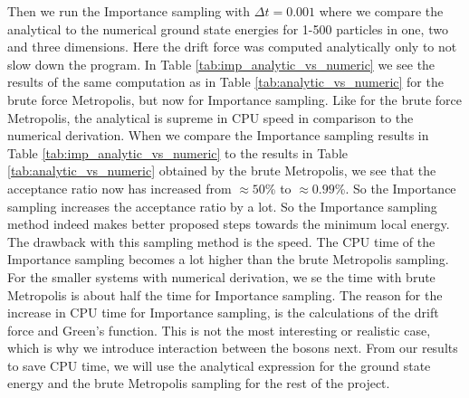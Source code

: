 \documentclass[12pt,a4paper,english]{article}
\begin{document}
Then we run the Importance sampling with $\Delta t=0.001$ where we compare the analytical to the numerical ground state energies for 1-500 particles in one, two and three dimensions. Here the drift force was computed analytically only to not slow down the program. In Table \ref{tab:imp_analytic_vs_numeric} we see the results of the same computation as in Table \ref{tab:analytic_vs_numeric} for the brute force Metropolis, but now for Importance sampling. Like for the brute force Metropolis, the analytical is supreme in CPU speed in comparison to the numerical derivation. When we compare the Importance sampling results in Table \ref{tab:imp_analytic_vs_numeric} to the results in Table \ref{tab:analytic_vs_numeric} obtained by the brute Metropolis, we see that the acceptance ratio now has increased from $\approx50$\% to $\approx0.99$\%. So the Importance sampling increases the acceptance ratio by a lot. So the Importance sampling method indeed makes better proposed steps towards the minimum local energy. The drawback with this sampling method is the speed. The CPU time of the Importance sampling becomes a lot higher than the brute Metropolis sampling. For the smaller systems with numerical derivation, we se the time with brute Metropolis is about half the time for Importance sampling. The reason for the increase in CPU time for Importance sampling, is the calculations of the drift force and Green's function. This is not the most interesting or realistic case, which is why we introduce interaction between the bosons next. From our results to save CPU time, we will use the analytical expression for the ground state energy and the brute Metropolis sampling for the rest of the project.
\end{document}
